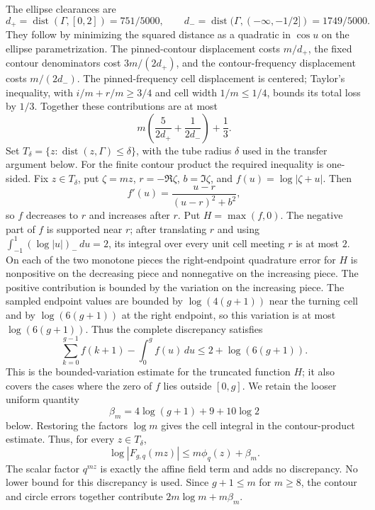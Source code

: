 The ellipse clearances are
\[
 d_+=\operatorname{dist}(\Gamma,[0,2])=751/5000,\qquad
 d_-=\operatorname{dist}(\Gamma,(-\infty,-1/2])=1749/5000.
\]
They follow by minimizing the squared distance as a quadratic in
$\cos u$ on the ellipse parametrization.  The pinned-contour displacement
costs $m/d_+$, the fixed contour denominators cost $3m/(2d_+)$, and the
contour-frequency displacement costs $m/(2d_-)$.  The pinned-frequency
cell displacement is centered; Taylor's inequality, with
$i/m+r/m\ge3/4$ and cell width $1/m\le1/4$, bounds its total loss by $1/3$.
Together these contributions are at most
\[
 m\left(\frac5{2d_+}+\frac1{2d_-}\right)+\frac13.
\]
Set $T_\delta=\{z:\operatorname{dist}(z,\Gamma)\le\delta\}$, with the tube
radius $\delta$ used in the transfer argument below.
For the finite contour product the required inequality is one-sided.  Fix
$z\in T_\delta$, put $\zeta=mz$, $r=-\Re\zeta$, $b=\Im\zeta$, and
$f(u)=\log|\zeta+u|$.  Then
\[
 f'(u)=\frac{u-r}{(u-r)^2+b^2},
\]
so $f$ decreases to $r$ and increases after $r$.  Put $H=\max(f,0)$.
The negative part of $f$ is supported near $r$; after translating $r$ and
using $\int_{-1}^{1}(\log|u|)_-\,du=2$, its integral over every unit cell
meeting $r$ is at most $2$.  On each of the two monotone pieces the
  right-endpoint quadrature error for $H$ is nonpositive on the decreasing
  piece and nonnegative on the increasing piece.  The positive contribution
  is bounded by the variation on the increasing piece.  The sampled endpoint
  values are bounded by
$\log(4(g+1))$ near the turning cell and by
$\log(6(g+1))$ at the right endpoint, so this variation is at most
$\log(6(g+1))$.  Thus the complete discrepancy satisfies
\[
 \sum_{k=0}^{g-1}f(k+1)-\int_0^g f(u)\,du
 \le 2+\log(6(g+1)).
\]
This is the bounded-variation estimate for the truncated function $H$; it
also covers the cases where the zero of $f$ lies outside $[0,g]$.  We retain
the looser uniform quantity
\[
 \beta_m=4\log(g+1)+9+10\log2
\]
below.  Restoring the factors $\log m$ gives the cell integral in the
contour-product estimate.
Thus, for every $z\in T_\delta$,
\begin{equation}\label{eq:p0-q-contour-product}
 \log|F_{g,q}(mz)|\le m\phi_q(z)+\beta_m.
\end{equation}
The scalar factor $q^{mz}$ is exactly the affine field term and adds no
discrepancy.  No lower bound for this discrepancy is used.
Since $g+1\le m$ for $m\ge8$, the contour
and circle errors together contribute $2m\log m+m\beta_m$.

